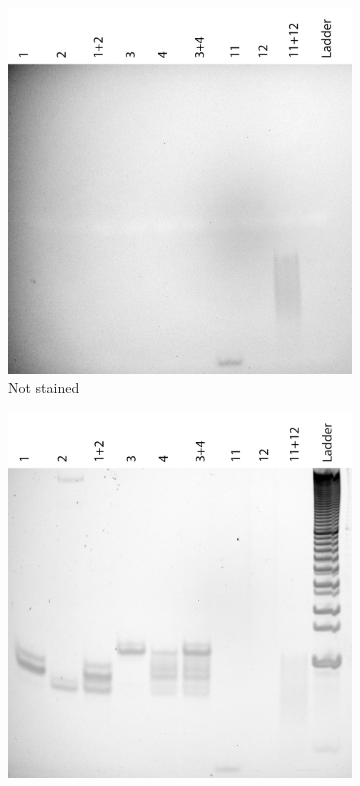 \begin{figure}[h]
\begin{subfigure}[t]{.5\textwidth}
  \includegraphics[width=\textwidth]{images/transcription_annealed_nostain.png}
  \caption{Not stained}
  \label{transcription_annealed_nostain}
\end{subfigure}
\begin{subfigure}[t]{.5\textwidth}
  \includegraphics[width=\textwidth]{images/transcription_annealed_stain.png}

\end{subfigure}
\end{figure}
